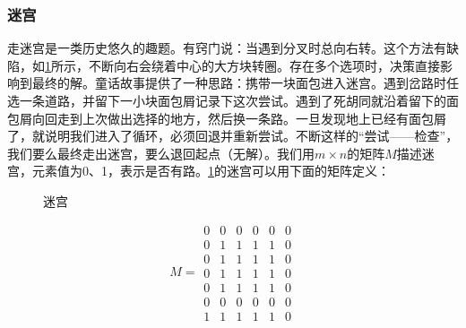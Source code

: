\documentclass[b5paper]{ctexart}
\begin{document}
\subsubsection{迷宫}
走迷宫是一类历史悠久的趣题。有窍门说：当遇到分叉时总向右转。这个方法有缺陷，如\cref{fig:maze-loop}所示，不断向右会绕着中心的大方块转圈。存在多个选项时，决策直接影响到最终的解。童话故事提供了一种思路：携带一块面包进入迷宫。遇到岔路时任选一条道路，并留下一小块面包屑记录下这次尝试。遇到了死胡同就沿着留下的面包屑向回走到上次做出选择的地方，然后换一条路。一旦发现地上已经有面包屑了，就说明我们进入了循环，必须回退并重新尝试。不断这样的“尝试——检查”，我们要么最终走出迷宫，要么退回起点（无解）。我们用$m \times n$的矩阵$M$描述迷宫，元素值为0、1，表示是否有路。\cref{fig:maze-loop}的迷宫可以用下面的矩阵定义：

\begin{figure}[htbp]
 \centering
 \caption{迷宫}
 \label{fig:maze-loop}
\end{figure}

\[
M = \begin{matrix}
0 & 0 & 0 & 0 & 0 & 0 \\
0 & 1 & 1 & 1 & 1 & 0 \\
0 & 1 & 1 & 1 & 1 & 0 \\
0 & 1 & 1 & 1 & 1 & 0 \\
0 & 1 & 1 & 1 & 1 & 0 \\
0 & 0 & 0 & 0 & 0 & 0 \\
1 & 1 & 1 & 1 & 1 & 0
\end{matrix}
\]
\end{document}
